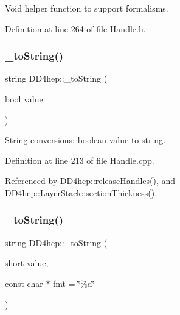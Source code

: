 Void helper function to support formalisms. 



Definition at line 264 of file Handle.\+h.

\hypertarget{group___d_d4_h_e_p___g_e_o_m_e_t_r_y_gaf0b4c8d8a6efc966a3609c4594448050}{}\label{group___d_d4_h_e_p___g_e_o_m_e_t_r_y_gaf0b4c8d8a6efc966a3609c4594448050} 
\subsubsection{\texorpdfstring{\+\_\+to\+String()}{\_toString()}\hspace{0.1cm}{\footnotesize\ttfamily [1/5]}}
{\footnotesize\ttfamily string D\+D4hep\+::\+\_\+to\+String (\begin{DoxyParamCaption}\item[{bool}]{value }\end{DoxyParamCaption})}



String conversions\+: boolean value to string. 



Definition at line 213 of file Handle.\+cpp.



Referenced by D\+D4hep\+::release\+Handles(), and D\+D4hep\+::\+Layer\+Stack\+::section\+Thickness().

\hypertarget{group___d_d4_h_e_p___g_e_o_m_e_t_r_y_ga33b8273e6b24bc97470fb7681a071e5f}{}\label{group___d_d4_h_e_p___g_e_o_m_e_t_r_y_ga33b8273e6b24bc97470fb7681a071e5f} 
\subsubsection{\texorpdfstring{\+\_\+to\+String()}{\_toString()}\hspace{0.1cm}{\footnotesize\ttfamily [2/5]}}
{\footnotesize\ttfamily string D\+D4hep\+::\+\_\+to\+String (\begin{DoxyParamCaption}\item[{short}]{value,  }\item[{const char $\ast$}]{fmt = {\ttfamily \char`\"{}\%d\char`\"{}} }\end{DoxyParamCaption})}



